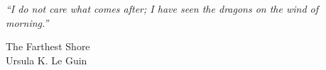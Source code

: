 \epigraph{
    \emph{
        ``I do not care what comes after; I have seen the dragons on the wind of morning.''
} 
%
}
{The Farthest Shore\\Ursula K. Le Guin}
%

